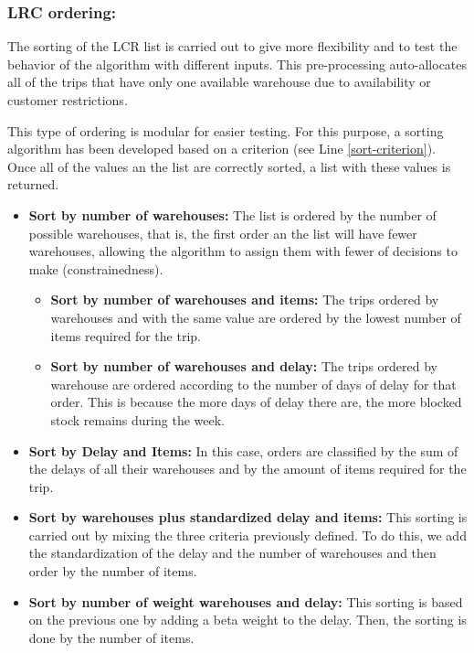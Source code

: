 \documentclass[letterpaper]{article} %
\begin{document}
\subsubsection*{LRC ordering:}
The sorting of the LCR list is carried out to give more flexibility and to test the behavior of the algorithm with different inputs. This pre-processing auto-allocates all of the trips that have only one available warehouse due to availability or customer restrictions.

This type of ordering is modular for easier testing. For this purpose, a sorting algorithm has been developed based on a criterion (see Line \ref{sort-criterion}). Once all of the values an the list are correctly sorted, a list with these values is returned.


\begin{itemize}
    \item \textbf{Sort by number of warehouses:} The list is ordered by the number of possible warehouses, that is, the first order an the list will have fewer warehouses, allowing the algorithm to assign them with fewer of decisions to make (constrainedness).
    \begin{itemize}
        \item \textbf{Sort by number of warehouses and items:} The trips ordered by warehouses and with the same value are ordered by the lowest number of items required for the trip.
        \item \textbf{Sort by number of warehouses and delay:} The trips ordered by warehouse are ordered according to the number of days of delay for that order. This is because the more days of delay there are, the more blocked stock remains during the week.
    \end{itemize}
    \item \textbf{Sort by Delay and Items:} In this case, orders are classified by the sum of the delays of all their warehouses and by the amount of items required for the trip.

    \item \textbf{Sort by warehouses plus standardized delay and items:} This sorting is carried out by mixing the three criteria previously defined. To do this, we add the standardization of the delay and the number of warehouses and then order by the number of items.
    \item \textbf{Sort by number of weight warehouses and delay:} This sorting is based on the previous one by adding a beta weight to the delay. Then, the sorting is done by the number of items.
\end{itemize}
\end{document}
